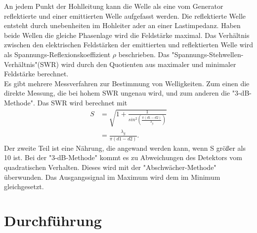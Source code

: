   An jedem Punkt der Hohlleitung kann die Welle als eine vom Generator reflektierte und einer emittierten Welle aufgefasst werden.
  Die reflektierte Welle entsteht durch unebenheiten im Hohleiter ader an einer Lastimpedanz.
  Haben beide Wellen die gleiche Phasenlage wird die Feldstärke maximal.
  Das Verhältnis zwischen den elektrischen Feldstärken der emittierten und reflektierten Welle wird als Spannungs-Reflexionskoeffizient $\rho$ beschrieben.
  Das "Spannungs-Stehwellen-Verhältnis"(SWR) wird durch den Quotienten aus maximaler und minimaler Feldstärke berechnet.\\
  Es gibt mehrere Messverfahren zur Bestimmung von Welligkeiten.
  Zum einen die direkte Messung, die bei hohem SWR ungenau wird, und zum anderen die "3-dB-Methode".
  Das SWR wird berechnet mit
  \begin{align}
    S &= \sqrt{1 + \frac{1}{sin^2\left(\frac{\pi (d1-d2)}{\lambda_g}\right)}}\\
      &= \frac{\lambda_g}{\pi (d1-d2)}.
    \label{eqn:2}
  \end{align}
  Der zweite Teil ist eine Nährung, die angewand werden kann, wenn S größer als 10 ist.
  Bei der "3-dB-Methode" kommt es zu Abweichungen des Detektors vom quadratischen Verhalten.
  Dieses wird mit der "Abschwächer-Methode" überwunden.
  Das Ausgangssignal im Maximum wird dem im Minimum gleichgesetzt.



  \section{Durchführung}

